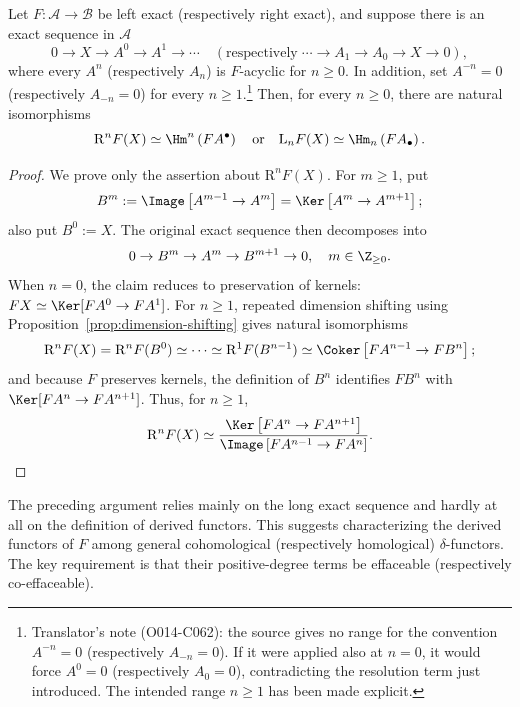 \begin{corollary}\label{prop:acyclic-resolution}
	Let $F:\mathcal{A}\to\mathcal{B}$ be left exact (respectively right
	exact), and suppose there is an exact sequence in $\mathcal{A}$
	\[ 0 \to X  \to A^0 \to A^1 \to \cdots \quad (\text{respectively}\; \cdots \to A_1 \to A_0 \to X \to 0 ), \]
	where every $A^n$ (respectively $A_n$) is $F$-acyclic for $n\geq0$.
	In addition, set $A^{-n}=0$ (respectively $A_{-n}=0$) for every
	$n\geq1$.\footnote{Translator's note (O014-C062): the source gives no
	range for the convention $A^{-n}=0$ (respectively $A_{-n}=0$). If it were
	applied also at $n=0$, it would force $A^0=0$ (respectively $A_0=0$),
	contradicting the resolution term just introduced. The intended range
	$n\geq1$ has been made explicit.} Then, for every $n\geq0$, there are
	natural isomorphisms
	\[ \mathrm{R}^n F(X) \simeq \Hm^n\left( FA^\bullet \right) \quad \text{or}\quad \mathrm{L}_n F(X) \simeq \Hm_n\left(FA_\bullet\right). \]
\end{corollary}
\begin{proof}
	We prove only the assertion about $\mathrm{R}^nF(X)$. For $m\geq1$, put
	\[ B^m := \Image\left[ A^{m-1} \to A^m \right] = \Ker\left[ A^m \to A^{m+1} \right]; \]
	also put $B^0:=X$. The original exact sequence then decomposes into
	\[ 0 \to B^m \to A^m \to B^{m+1} \to 0, \quad m \in \Z_{\geq 0}. \]
	When $n=0$, the claim reduces to preservation of kernels:
	$FX\simeq\Ker[FA^0\to FA^1]$. For $n\geq1$, repeated dimension shifting
	using Proposition~\ref{prop:dimension-shifting} gives natural isomorphisms
	\[ \mathrm{R}^n F(X) = \mathrm{R}^n F(B^0) \simeq \cdots \simeq \mathrm{R}^1 F(B^{n-1}) \simeq \Coker\left[ FA^{n-1} \to FB^n \right]; \]
	and because $F$ preserves kernels, the definition of $B^n$ identifies
	$FB^n$ with $\Ker[FA^n\to FA^{n+1}]$. Thus, for $n\geq1$,
	\[ \mathrm{R}^n F(X) \simeq \frac{\Ker\left[ FA^n \to FA^{n+1} \right]}{\Image\left[ FA^{n-1} \to FA^n \right]}. \]
\end{proof}

The preceding argument relies mainly on the long exact sequence and hardly at
all on the definition of derived functors. This suggests characterizing the
derived functors of $F$ among general cohomological (respectively homological)
$\delta$-functors. The key requirement is that their positive-degree terms be
effaceable (respectively co-effaceable).


